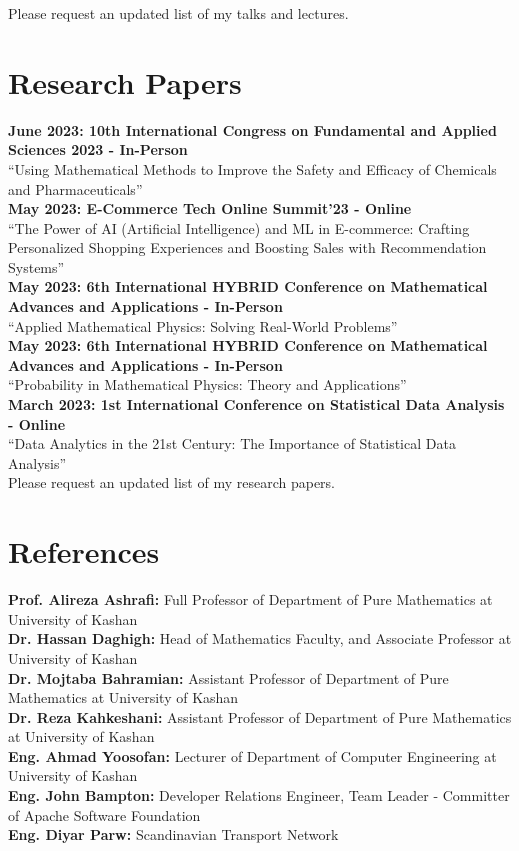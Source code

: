 \documentclass[a4paper,10pt]{article}
\begin{document}
Please request an updated list of my talks and lectures.

\section{\textbf{Research Papers}}
\textbf{June 2023: 10th International Congress on Fundamental and Applied Sciences 2023 - In-Person}\\
“Using Mathematical Methods to Improve the Safety and Efficacy of Chemicals and Pharmaceuticals”\\
\textbf{May 2023: E-Commerce Tech Online Summit’23 - Online}\\
“The Power of AI (Artificial Intelligence) and ML in E-commerce: Crafting Personalized Shopping Experiences and Boosting Sales with Recommendation Systems”\\
\textbf{May 2023: 6th International HYBRID Conference on Mathematical Advances and Applications - In-Person}\\
“Applied Mathematical Physics: Solving Real-World Problems”\\
\textbf{May 2023: 6th International HYBRID Conference on Mathematical Advances and Applications - In-Person}\\
“Probability in Mathematical Physics: Theory and Applications”\\
\textbf{March 2023: 1st International Conference on Statistical Data Analysis - Online}\\
“Data Analytics in the 21st Century: The Importance of Statistical Data Analysis”\\

Please request an updated list of my research papers.

\section{\textbf{References}}

\textbf{Prof. Alireza Ashrafi:} Full Professor of Department of Pure Mathematics at University of Kashan\\
\textbf{Dr. Hassan Daghigh:} Head of Mathematics Faculty, and Associate Professor at University of Kashan\\
\textbf{Dr. Mojtaba Bahramian:} Assistant Professor of Department of Pure Mathematics at University of Kashan\\
\textbf{Dr. Reza Kahkeshani:} Assistant Professor of Department of Pure Mathematics at University of Kashan\\
\textbf{Eng. Ahmad Yoosofan:} Lecturer of Department of Computer Engineering at University of Kashan\\
\textbf{Eng. John Bampton:} Developer Relations Engineer, Team Leader - Committer of Apache Software Foundation\\
\textbf{Eng. Diyar Parw:} Scandinavian Transport Network\\
\end{document}
